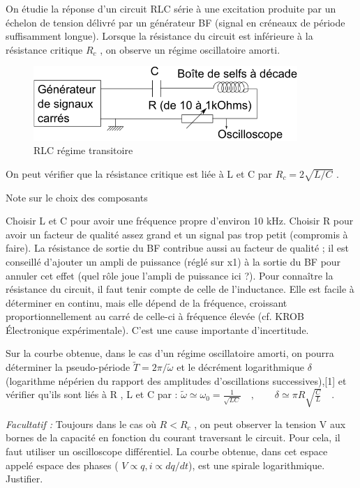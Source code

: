 \documentclass{article}%
\begin{document}
On étudie la réponse d'un circuit RLC série à une excitation produite par un échelon de tension délivré par un générateur BF (signal en créneaux de période suffisamment longue). Lorsque la résistance du circuit est inférieure à la résistance critique $R_{c}$ , on observe un régime oscillatoire amorti.
\begin{figure}
	\centerline{\includegraphics[width=10cm]{images-exp/RLC.png}}
	\caption{RLC régime transitoire}
\end{figure}

On peut vérifier que la résistance critique est liée à L et C par $R_{c} = 2\sqrt{L/C}$ .

Note sur le choix des composants 

    Choisir L et C pour avoir une fréquence propre d'environ 10 kHz.
    Choisir R pour avoir un facteur de qualité assez grand et un signal pas trop petit (compromis à faire).
    La résistance de sortie du BF contribue aussi au facteur de qualité ; il est conseillé d'ajouter un ampli de puissance (réglé sur x1) à la sortie du BF pour annuler cet effet (quel rôle joue l'ampli de puissance ici ?).
    Pour connaître la résistance du circuit, il faut tenir compte de celle de l'inductance. Elle est facile à déterminer en continu, mais elle dépend de la fréquence, croissant proportionnellement au carré de celle-ci à fréquence élevée (cf. KROB Électronique expérimentale). C'est une cause importante d'incertitude.

Sur la courbe obtenue, dans le cas d'un régime oscillatoire amorti, on pourra déterminer la pseudo-période $\tilde T=2\pi/\tilde\omega$ et le décrément logarithmique $\delta$ (logarithme népérien du rapport des amplitudes d'oscillations successives),[1] et vérifier qu'ils sont liés à R , L et C par :
$ \tilde\omega \simeq \omega_0 =\frac{1}{\sqrt {LC}} \quad,\qquad \delta\simeq \pi R\sqrt{\frac{C}{L}}\quad$.

\textit{Facultatif :}
Toujours dans le cas où $R < R_{c}$ , on peut observer la tension V aux bornes de la capacité en fonction du courant traversant le circuit. Pour cela, il faut utiliser un oscilloscope différentiel. La courbe obtenue, dans cet espace appelé espace des phases ( $V\propto q, i\propto dq/dt$), est une spirale logarithmique. Justifier.
\end{document}
